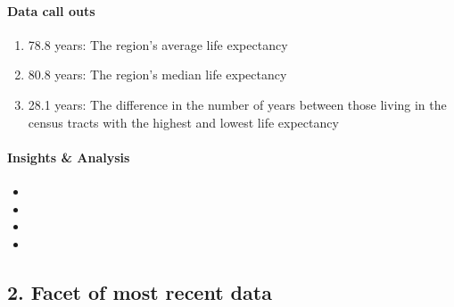 \documentclass[
]{article}
\providecommand{\tightlist}{%
  \setlength{\itemsep}{0pt}\setlength{\parskip}{0pt}}
\begin{document}
\hypertarget{data-call-outs-1}{%
\paragraph{Data call outs}\label{data-call-outs-1}}

\begin{enumerate}
\def\labelenumi{\arabic{enumi}.}
\tightlist
\item
  78.8 years: The region's average life expectancy
\item
  80.8 years: The region's median life expectancy
\item
  28.1 years: The difference in the number of years between those living
  in the census tracts with the highest and lowest life expectancy
\end{enumerate}

\hfill\break

\hypertarget{insights-analysis-1}{%
\paragraph{Insights \& Analysis}\label{insights-analysis-1}}

\begin{itemize}
\tightlist
\item
\item
\item
\item
\end{itemize}

\hfill\break
\hfill\break

\hypertarget{facet-of-most-recent-data}{%
\subsection{2. Facet of most recent
data}\label{facet-of-most-recent-data}}
\end{document}
